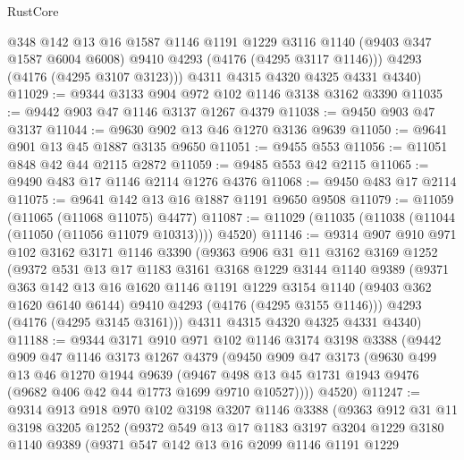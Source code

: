 \begin{lexlean}{RustCore}
\begin{coremodule}
          @348
          @142
          @13
          @16
          @1587
          @1146
          @1191
          @1229
          @3116
          @1140
          (@9403 @347 @1587 @6004 @6008)
          @9410
          @4293
          (@4176 (@4295 @3117 @1146)))
        @4293
        (@4176 (@4295 @3107 @3123)))
      @4311
      @4315
      @4320
      @4325
      @4331
      @4340)
@11029 := @9344 @3133 @904 @972 @102 @1146 @3138 @3162 @3390
@11035 := @9442 @903 @47 @1146 @3137 @1267 @4379
@11038 := @9450 @903 @47 @3137
@11044 := @9630 @902 @13 @46 @1270 @3136 @9639
@11050 := @9641 @901 @13 @45 @1887 @3135 @9650
@11051 := @9455 @553
@11056 := @11051 @848 @42 @44 @2115 @2872
@11059 := @9485 @553 @42 @2115
@11065 := @9490 @483 @17 @1146 @2114 @1276 @4376
@11068 := @9450 @483 @17 @2114
@11075 := @9641 @142 @13 @16 @1887 @1191 @9650 @9508
@11079 := @11059 (@11065 (@11068 @11075) @4477)
@11087 := @11029 (@11035 (@11038 (@11044 (@11050 (@11056 @11079 @10313)))) @4520)
@11146 := @9314
    @907
    @910
    @971
    @102
    @3162
    @3171
    @1146
    @3390
    (@9363
      @906
      @31
      @11
      @3162
      @3169
      @1252
      (@9372
        @531
        @13
        @17
        @1183
        @3161
        @3168
        @1229
        @3144
        @1140
        @9389
        (@9371
          @363
          @142
          @13
          @16
          @1620
          @1146
          @1191
          @1229
          @3154
          @1140
          (@9403 @362 @1620 @6140 @6144)
          @9410
          @4293
          (@4176 (@4295 @3155 @1146)))
        @4293
        (@4176 (@4295 @3145 @3161)))
      @4311
      @4315
      @4320
      @4325
      @4331
      @4340)
@11188 := @9344
    @3171
    @910
    @971
    @102
    @1146
    @3174
    @3198
    @3388
    (@9442
      @909
      @47
      @1146
      @3173
      @1267
      @4379
      (@9450
        @909
        @47
        @3173
        (@9630
          @499
          @13
          @46
          @1270
          @1944
          @9639
          (@9467 @498 @13 @45 @1731 @1943 @9476 (@9682 @406 @42 @44 @1773 @1699 @9710 @10527))))
      @4520)
@11247 := @9314
    @913
    @918
    @970
    @102
    @3198
    @3207
    @1146
    @3388
    (@9363
      @912
      @31
      @11
      @3198
      @3205
      @1252
      (@9372
        @549
        @13
        @17
        @1183
        @3197
        @3204
        @1229
        @3180
        @1140
        @9389
        (@9371
          @547
          @142
          @13
          @16
          @2099
          @1146
          @1191
          @1229

\end{coremodule}
\end{lexlean}
